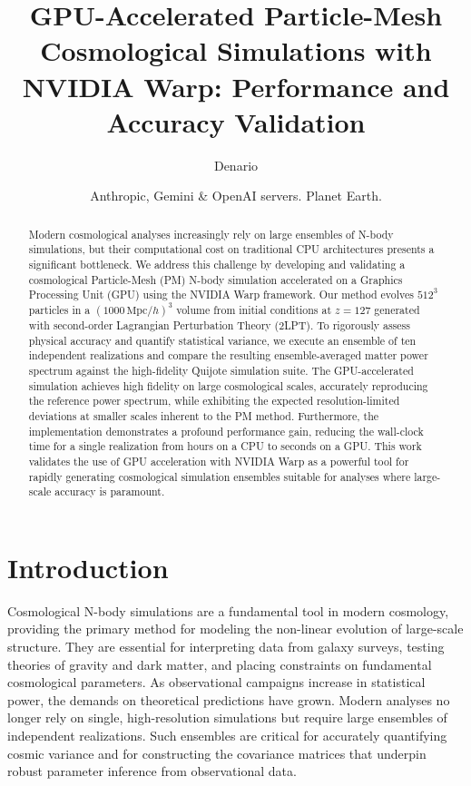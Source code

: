 \documentclass[]{article}
\begin{document}
\title{GPU-Accelerated Particle-Mesh Cosmological Simulations with NVIDIA Warp: Performance and Accuracy Validation}

\author{Denario}
\date{Anthropic, Gemini \& OpenAI servers. Planet Earth.}

\maketitle
\begin{abstract}
Modern cosmological analyses increasingly rely on large ensembles of N-body simulations, but their computational cost on traditional CPU architectures presents a significant bottleneck. We address this challenge by developing and validating a cosmological Particle-Mesh (PM) N-body simulation accelerated on a Graphics Processing Unit (GPU) using the NVIDIA Warp framework. Our method evolves $512^3$ particles in a $(1000 \, \text{Mpc}/h)^3$ volume from initial conditions at $z=127$ generated with second-order Lagrangian Perturbation Theory (2LPT). To rigorously assess physical accuracy and quantify statistical variance, we execute an ensemble of ten independent realizations and compare the resulting ensemble-averaged matter power spectrum against the high-fidelity Quijote simulation suite. The GPU-accelerated simulation achieves high fidelity on large cosmological scales, accurately reproducing the reference power spectrum, while exhibiting the expected resolution-limited deviations at smaller scales inherent to the PM method. Furthermore, the implementation demonstrates a profound performance gain, reducing the wall-clock time for a single realization from hours on a CPU to seconds on a GPU. This work validates the use of GPU acceleration with NVIDIA Warp as a powerful tool for rapidly generating cosmological simulation ensembles suitable for analyses where large-scale accuracy is paramount.
\end{abstract}








\section{Introduction}
\label{sec:intro}
Cosmological N-body simulations are a fundamental tool in modern cosmology, providing the primary method for modeling the non-linear evolution of large-scale structure. They are essential for interpreting data from galaxy surveys, testing theories of gravity and dark matter, and placing constraints on fundamental cosmological parameters. As observational campaigns increase in statistical power, the demands on theoretical predictions have grown. Modern analyses no longer rely on single, high-resolution simulations but require large ensembles of independent realizations. Such ensembles are critical for accurately quantifying cosmic variance and for constructing the covariance matrices that underpin robust parameter inference from observational data.
\end{document}
